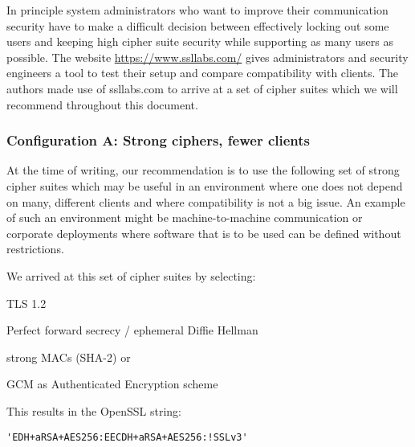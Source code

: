 
In principle system administrators who want to improve their communication security
have to make a difficult decision between effectively locking out some users and 
keeping high cipher suite security while supporting as many users as possible.
The website \url{https://www.ssllabs.com/} gives administrators and security engineers
a tool to test their setup and compare compatibility with clients. The authors made 
use of ssllabs.com to arrive at a set of cipher suites which we will recommend 
throughout this document.



\subsubsection{Configuration A: Strong ciphers, fewer clients}

At the time of writing, our recommendation is to use the following set of strong cipher
suites which may be useful in an environment where one does not depend on many,
different clients and where compatibility is not a big issue.  An example
of such an environment might be machine-to-machine communication or corporate
deployments where software that is to be used can be defined without restrictions.


We arrived at this set of cipher suites by selecting:

\begin{itemize*}
  \item TLS 1.2
  \item Perfect forward secrecy / ephemeral Diffie Hellman
  \item strong MACs (SHA-2) or
  \item GCM as Authenticated Encryption scheme
\end{itemize*}

This results in the OpenSSL string:

\begin{lstlisting}
'EDH+aRSA+AES256:EECDH+aRSA+AES256:!SSLv3'
\end{lstlisting}

